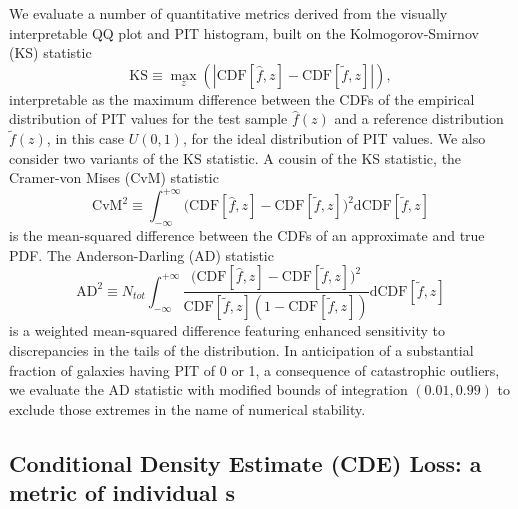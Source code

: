 We evaluate a number of quantitative metrics derived from the visually interpretable QQ plot and PIT histogram, built on the Kolmogorov-Smirnov (KS) statistic
\begin{equation}
  \label{eq:ks}
  \mathrm{KS} \equiv \max_{z} \left( \left| \mathrm{CDF}[\hat{f}, z] - \mathrm{CDF}[\tilde{f}, z] \right| \right),
\end{equation}
interpretable as the maximum difference between the CDFs of the empirical distribution of PIT values for the test sample $\hat{f}(z)$ and a reference distribution $\tilde{f}(z)$, in this case $U(0,1)$, for the ideal distribution of PIT values.
We also consider two variants of the KS statistic.
A cousin of the KS statistic, the Cramer-von Mises (CvM) statistic
\begin{equation}
\label{eq:cvm}
  \mathrm{CvM}^{2} \equiv \int_{-\infty}^{+\infty} \big(\mathrm{CDF}[\hat{f}, z] - \mathrm{CDF}[\tilde{f}, z]\big)^2 \mathrm{d}\mathrm{CDF}[\tilde{f}, z]
\end{equation}
is the mean-squared difference between the CDFs of an approximate and true PDF.
The Anderson-Darling (AD) statistic
\begin{equation} \label{eq:ad}
  \mathrm{AD}^2 \equiv N_{tot}\int_{-\infty}^{+\infty} \frac{\big(\mathrm{CDF}[\hat{f}, z] - \mathrm{CDF}[\tilde{f}, z]\big)^2} {\mathrm{CDF}[\tilde{f}, z] (1 -\mathrm{CDF}[\tilde{f}, z])} \mathrm{d}\mathrm{CDF}[\tilde{f}, z]
\end{equation}
is a weighted mean-squared difference featuring enhanced sensitivity to discrepancies in the tails of the distribution.
In anticipation of a substantial fraction of galaxies having PIT of 0 or 1, a consequence of catastrophic outliers, we evaluate the AD statistic with modified bounds of integration $(0.01, 0.99)$ to exclude those extremes in the name of numerical stability.

\subsection{Conditional Density Estimate (CDE) Loss: a metric of individual \pzpdf s}
\label{sec:CDE_loss}

